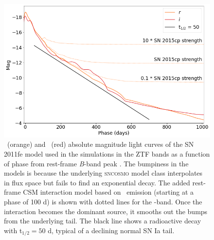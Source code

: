 \documentclass[a4paper,oneside,12pt, class=Latex/Classes/PhDthesisPSnPDF, crop=false]{standalone}
\begin{document}
\begin{figure}
 \centering
 \includegraphics[width=\textwidth]{../Images/chapter_3/11fe_mods.png}
 \caption[\ztfr\ and \ztfi\ model light curves.]{\ztfr\ (orange) and \ztfi\ (red) absolute magnitude light curves of the SN 2011fe model used in the simulations in the ZTF bands as a function of phase from rest-frame \textit{B}-band peak \citep{spec_HST}. The bumpiness in the models is because the underlying \textsc{sncosmo} model class interpolates in flux space but fails to find an exponential decay. The added rest-frame CSM interaction model based on \Halpha~emission (starting at a phase of 100 d) is shown with dotted lines for the \ztfr-band. Once the interaction becomes the dominant source, it smooths out the bumps from the underlying tail. The black line shows a radioactive decay with t$_{1/2}=50$ d, typical of a declining normal SN Ia tail.}
 \label{11fe_mods}
\end{figure}
\end{document}
